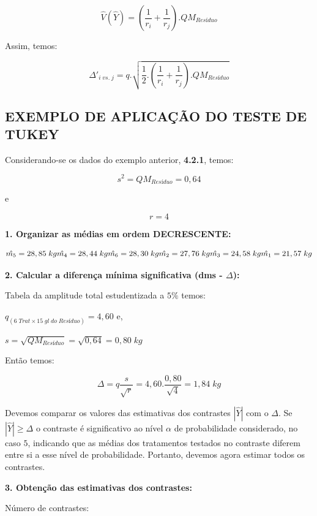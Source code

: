 \documentclass[
]{book}
\begin{document}
\[
\hat{V}(\hat{Y}) = \left( \frac{1}{r_i} + \frac{1}{r_j} \right).QM_{Resíduo}
\]

Assim, temos:

\[
\Delta'_{i\;vs.\;j} = q.\sqrt{\frac{1}{2}.\left( \frac{1}{r_i} + \frac{1}{r_j} \right).QM_{Resíduo}}
\]

\hypertarget{exemplo-de-aplicauxe7uxe3o-do-teste-de-tukey}{%
\subsection{EXEMPLO DE APLICAÇÃO DO TESTE DE TUKEY}\label{exemplo-de-aplicauxe7uxe3o-do-teste-de-tukey}}

Considerando-se os dados do exemplo anterior, \textbf{4.2.1}, temos:

\[
s^2 = QM_{Resíduo} = 0,64
\]

e

\[
r=4
\]

\textbf{1. Organizar as médias em ordem DECRESCENTE:}

\[
\hat{m_5} = 28,85\;kg \\
\hat{m_4} = 28,44\;kg \\
\hat{m_6} = 28,30\;kg \\
\hat{m_2} = 27,76\;kg \\
\hat{m_3} = 24,58\;kg \\
\hat{m_1} = 21,57\;kg 
\]

\textbf{2. Calcular a diferença mínima significativa (dms - \(\Delta\)):}

Tabela da amplitude total estudentizada a \(5\%\) temos:

\(q_{(6\;Trat \times 15\;gl\;do\;Resíduo)} = 4,60\) e,

\(s=\sqrt{QM_{Resíduo}} = \sqrt{0,64} = 0,80\;kg\)

Então temos:

\[
\Delta = q\frac{s}{\sqrt{r}} = 4,60.\frac{0,80}{\sqrt{4}} = 1,84\;kg
\]

Devemos comparar os valores das estimativas dos contrastes \(|\hat{Y}|\) com o \(\Delta\). Se \(|\hat{Y}| \ge \Delta\) o contraste é significativo ao nível \(\alpha\) de probabilidade considerado, no caso \(5%
\), indicando que as médias dos tratamentos testados no contraste diferem entre si a esse nível de probabilidade. Portanto, devemos agora estimar todos os contrastes.

\textbf{3. Obtenção das estimativas dos contrastes:}

Número de contrastes:
\end{document}
